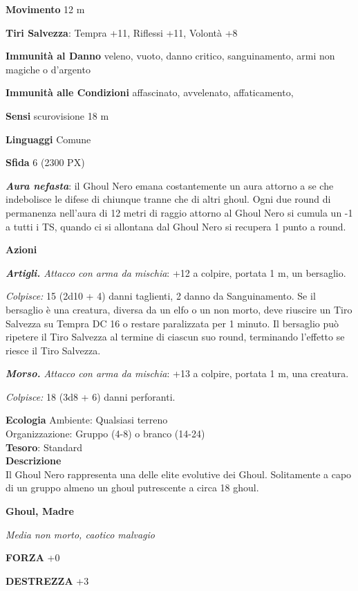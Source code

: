 \begin{multicols}{2}
	\textbf{Movimento} 12 m

	\textbf{Tiri Salvezza}: Tempra +11, Riflessi +11, Volontà +8

	\textbf{Immunità al Danno} veleno, vuoto, danno critico, sanguinamento, armi non magiche o d'argento

	\textbf{Immunità alle Condizioni} affascinato, avvelenato, affaticamento,

	\textbf{Sensi} scurovisione 18 m

	\textbf{Linguaggi} Comune

	\textbf{Sfida} 6 (2300 PX)

	\textbf{\textit{Aura nefasta}}: il Ghoul Nero emana costantemente un aura attorno a se che indebolisce le difese di chiunque tranne che di altri ghoul. Ogni due round di permanenza nell'aura di 12 metri di raggio attorno al Ghoul Nero si cumula un -1 a tutti i TS, quando ci si allontana dal Ghoul Nero si recupera 1 punto a round.

	\textbf{Azioni}

	\textit{\textbf{Artigli.} Attacco con arma da mischia}: +12 a colpire, portata 1 m, un bersaglio.

	\textit{Colpisce:} 15 (2d10 + 4) danni taglienti, 2 danno da Sanguinamento. Se il bersaglio è una creatura, diversa da un elfo o un non morto, deve riuscire un Tiro Salvezza su Tempra DC 16 o restare paralizzata per 1 minuto. Il bersaglio può ripetere il Tiro Salvezza al termine di ciascun suo round, terminando l'effetto se riesce il Tiro Salvezza.

	\textit{\textbf{Morso.} Attacco con arma da mischia}: +13 a colpire, portata 1 m, una creatura.

	\textit{Colpisce:} 18 (3d8 + 6) danni perforanti.

	\textbf{Ecologia}
	Ambiente: Qualsiasi terreno\\
	Organizzazione: Gruppo (4-8) o branco (14-24)\\
	\textbf{Tesoro}: Standard\\
	\textbf{Descrizione}\\
	Il Ghoul Nero rappresenta una delle elite evolutive dei Ghoul. Solitamente a capo di un gruppo almeno un ghoul putrescente a circa 18 ghoul.

	\medskip{}\textbf{Ghoul, Madre}

	\textit{Media non morto, caotico malvagio}

	\textbf{FORZA} +0

	\textbf{DESTREZZA} +3


\end{multicols}
